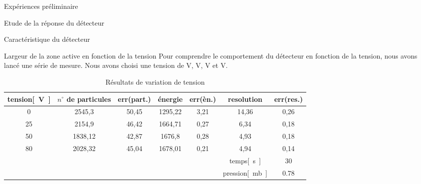 \documentclass[a4paper,11pt]{scrartcl}
\begin{document}
  \begin{section}{Expériences préliminaire}
   \begin{subsection}{Etude de la réponse du détecteur}
    \begin{subsubsection}{Caractéristique du détecteur}
    \end{subsubsection}
    \begin{subsubsection}{Largeur de la zone active en fonction de la tension}
     Pour comprendre le comportement du détecteur en fonction de la tension, nous avons lancé une série de mesure. Nous avons choisi une tension de \unit[0]{V}, \unit[25]{V}, \unit[50]{V} et \unit[80]{V}.
\begin{table}[htbp]
\caption{Résultats de variation de tension}
\begin{center}
\begin{tabular}{|c||c|c|c|c|c|c|}
\hline
tension\unit{[V]} & $n^{\circ}$ de particules	& err(part.) & énergie	&	err(èn.)	& resolution & err(res.)	\\ \hline \hline
0	&	2545,3	&	50,45	&	1295,22	&	3,21	&	14,36	&	0,26		\\ \hline
25	&	2154,9	&	46,42	&	1664,71	&	0,27	&	6,34	&	0,18		\\ \hline
50	&	1838,12	&	42,87	&	1676,8	&	0,28	&	4,93	&	0,18		\\ \hline
80	&	2028,32	&	45,04	&	1678,01	&	0,21	&	4,94	&	0,14		\\ \hline\hline
\multicolumn{ 5}{|c|}{} & temps\unit{[s]} & 30 \\ \cline{ 6- 7}
\multicolumn{ 5}{|c|}{} & pression\unit{[mb]}& 0.78 \\ \hline
\end{tabular}
\end{center}
\end{table}

    \end{subsubsection}
  \end{subsection} 


\end{section}
\end{document}
